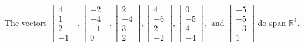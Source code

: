 \begin{exercise}
\begin{exerciseStatement}
  \end{exerciseStatement}
  \begin{exerciseAnswer}
   The vectors \(\left[\begin{array}{r}
4 \\
1 \\
2 \\
-1
\end{array}\right] , \left[\begin{array}{r}
-2 \\
-4 \\
-1 \\
0
\end{array}\right] , \left[\begin{array}{r}
2 \\
-4 \\
3 \\
2
\end{array}\right] , \left[\begin{array}{r}
4 \\
-6 \\
2 \\
-2
\end{array}\right] , \left[\begin{array}{r}
0 \\
-5 \\
4 \\
-4
\end{array}\right] , \text{ and } \left[\begin{array}{r}
-5 \\
-5 \\
-3 \\
1
\end{array}\right]\) 
  	 do  
	span \(\mathbb{R}^4\).
  


  \end{exerciseAnswer}
\end{exercise}